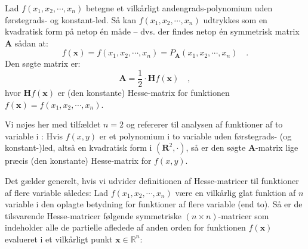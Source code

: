 \begin{lemma}
Lad $f(x_{1}, x_{2}, \cdots, x_{n})$ betegne et vilkårligt andengrads-polynomium uden førstegrads- og konstant-led. Så kan $f(x_{1}, x_{2}, \cdots, x_{n})$   udtrykkes som en kvad\-ra\-tisk form på netop \'{e}n måde -- dvs. der findes netop \'{e}n symmetrisk matrix $\mathbf{A}$ sådan at:
\begin{equation}
f(\mathbf{x}) = f(x_{1}, x_{2}, \cdots, x_{n}) = P_{\mathbf{A}}(x_{1}, x_{2}, \cdots, x_{n}) \quad.
\end{equation}
Den søgte matrix er:
\begin{equation} \label{eqHessKvad}
\mathbf{A} = \frac{1}{2}\cdot \mathbf{H}f(\mathbf{x}) \quad,
\end{equation}
hvor $\mathbf{H}f(\mathbf{x})$ er (den konstante) Hesse-matrix for funktionen $f(\mathbf{x}) = f(x_{1}, x_{2}, \cdots, x_{n})$.

\end{lemma}
\begin{bevis}
Vi nøjes her med tilfældet $n = 2$ og refererer til analysen af funktioner af to variable i  : Hvis $f(x,y)$ er et polynomium i to variable uden førstegrads- (og konstant-)led, altså en kvadratisk form i $(\mathbf{R}^{2}, \bm{\cdot})$, så er den søgte $\mathbf{A}$-matrix lige præcis (den konstante) Hesse-matrix for $f(x,y)$.
\end{bevis}


Det gælder generelt, hvis vi udvider definitionen af Hesse-matricer til funktioner af flere variable således: Lad $f(x_{1}, x_{2}, \cdots, x_{n})$ være en vilkårlig glat funktion af $n$ variable i den oplagte  betydning for funktioner af flere variable (end to). Så er de tilsvarende Hesse-matricer følgende symmetriske $(n \times n)$-matricer som indeholder alle de partielle afledede af anden orden for funktionen $f(\mathbf{x})$ evalueret i et vilkårligt punkt $\mathbf{x} \in \mathbb{R}^{n}$:

